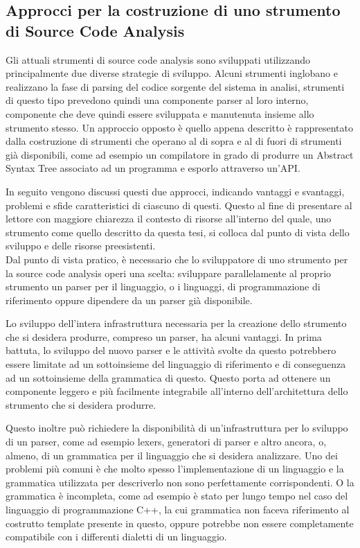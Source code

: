 \subsection{Approcci per la costruzione di uno strumento di Source Code
Analysis}

Gli attuali strumenti di source code analysis sono sviluppati utilizzando
principalmente due diverse strategie di sviluppo. Alcuni strumenti inglobano e
realizzano la fase di parsing del codice sorgente del sistema in analisi,
strumenti di questo tipo prevedono quindi una componente parser al loro
interno, componente che deve quindi essere sviluppata e manutenuta insieme allo
strumento stesso. Un approccio opposto è quello appena descritto è
rappresentato dalla costruzione di strumenti che operano al di sopra e al di
fuori di strumenti già disponibili, come ad esempio un compilatore in grado di
produrre un Abstract Syntax Tree associato ad un programma e esporlo attraverso
un’API.

In seguito vengono discussi questi due approcci, indicando vantaggi e
svantaggi, problemi e sfide caratteristici di ciascuno di questi. Questo al
fine di presentare al lettore con maggiore chiarezza il contesto di risorse
all’interno del quale, uno strumento come quello descritto da questa tesi, si
colloca dal punto di vista dello sviluppo e delle risorse preesistenti.\\

Dal punto di vista pratico, è necessario che lo sviluppatore di uno strumento
per la source code analysis operi una scelta: sviluppare parallelamente al
proprio strumento un parser per il linguaggio, o i linguaggi, di programmazione
di riferimento oppure dipendere da un parser già disponibile.

Lo sviluppo dell’intera infrastruttura necessaria per la creazione dello
strumento che si desidera produrre, compreso un parser, ha alcuni vantaggi. In
prima battuta, lo sviluppo del nuovo parser e le attività svolte da questo
potrebbero essere limitate ad un sottoinsieme del linguaggio di riferimento e
di conseguenza ad un sottoinsieme della grammatica di questo. Questo porta ad
ottenere un componente leggero e più facilmente integrabile all'interno
dell'architettura dello strumento che si desidera produrre.

Questo inoltre può richiedere la disponibilità di un’infrastruttura per lo
sviluppo di un parser, come ad esempio lexers, generatori di parser e altro
ancora, o, almeno, di un grammatica per il linguaggio che si desidera
analizzare. Uno dei problemi più comuni è che molto spesso l’implementazione di
un linguaggio e la grammatica utilizzata per descriverlo non sono perfettamente
corrispondenti. O la grammatica è incompleta, come ad esempio è stato per lungo
tempo nel caso del linguaggio di programmazione C++, la cui grammatica non
faceva riferimento al costrutto template presente in questo, oppure potrebbe
non essere completamente compatibile con i differenti dialetti di un
linguaggio.

